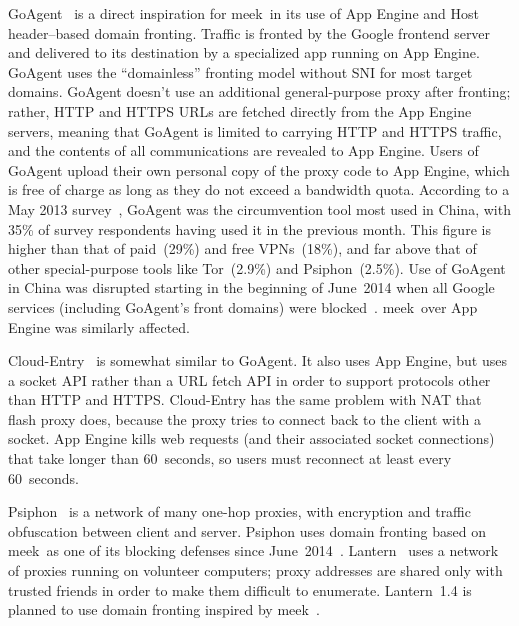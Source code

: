 \documentclass[conference]{IEEEtran}
\def\meek{meek}
\begin{document}
GoAgent~\cite{goagent} is a direct inspiration for \meek\ in its use of App
Engine and Host header--based domain fronting.
Traffic is fronted by the Google frontend server
and delivered to its destination by a specialized app running on App Engine.
GoAgent uses the ``domainless'' fronting model without SNI for most target domains.
GoAgent doesn't use an additional general-purpose proxy after fronting;
rather, HTTP and HTTPS URLs are fetched directly from the App Engine servers,
meaning that GoAgent is limited to carrying HTTP and HTTPS traffic,
and the contents of all communications are revealed to App Engine.
Users of GoAgent upload their own personal copy of the proxy code to App Engine,
which is free of charge as long as they do not exceed a bandwidth quota.
According to a May 2013 survey~\cite{collateral-freedom},
GoAgent was the circumvention tool most used in
China, with 35\% of survey respondents having used it in the previous month.
This figure is higher than that of paid~(29\%) and free VPNs~(18\%), and far
above that of other special-purpose tools like Tor~(2.9\%) and Psiphon~(2.5\%).
Use of GoAgent in China was disrupted starting in the beginning of June~2014
when all Google services (including GoAgent's front domains) were blocked~\cite{cn-google-block}.
\meek\ over App Engine was similarly affected.

Cloud-Entry~\cite{cloud-entry} is somewhat similar to GoAgent.
It also uses App Engine, but uses a socket API rather than a URL fetch API
in order to support protocols other than HTTP and HTTPS.
Cloud-Entry has the same problem with NAT that flash proxy does,
because the proxy tries to connect back to the client with a socket.
App Engine kills web requests (and their associated socket connections)
that take longer than 60~seconds,
so users must reconnect at least every 60~seconds.

Psiphon~\cite{psiphon} is a network of many one-hop proxies,
with encryption and traffic obfuscation between client and server.
Psiphon uses domain fronting based on \meek\ as one of its blocking defenses since June~2014~\cite{psiphon-meek-merge}.
Lantern~\cite{lantern} uses a network of proxies running on volunteer computers;
proxy addresses are shared only with trusted friends in order to make them difficult to enumerate.
Lantern~1.4 is planned to use domain fronting inspired by \meek~\cite{lantern-1.3.1}.

\end{document}
